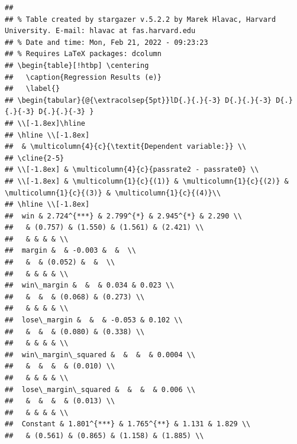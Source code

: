 \documentclass[
  12pt,
  landscape]{article}
\begin{document}
\begin{verbatim}
## 
## % Table created by stargazer v.5.2.2 by Marek Hlavac, Harvard University. E-mail: hlavac at fas.harvard.edu
## % Date and time: Mon, Feb 21, 2022 - 09:23:23
## % Requires LaTeX packages: dcolumn 
## \begin{table}[!htbp] \centering 
##   \caption{Regression Results (e)} 
##   \label{} 
## \begin{tabular}{@{\extracolsep{5pt}}lD{.}{.}{-3} D{.}{.}{-3} D{.}{.}{-3} D{.}{.}{-3} } 
## \\[-1.8ex]\hline 
## \hline \\[-1.8ex] 
##  & \multicolumn{4}{c}{\textit{Dependent variable:}} \\ 
## \cline{2-5} 
## \\[-1.8ex] & \multicolumn{4}{c}{passrate2 - passrate0} \\ 
## \\[-1.8ex] & \multicolumn{1}{c}{(1)} & \multicolumn{1}{c}{(2)} & \multicolumn{1}{c}{(3)} & \multicolumn{1}{c}{(4)}\\ 
## \hline \\[-1.8ex] 
##  win & 2.724^{***} & 2.799^{*} & 2.945^{*} & 2.290 \\ 
##   & (0.757) & (1.550) & (1.561) & (2.421) \\ 
##   & & & & \\ 
##  margin &  & -0.003 &  &  \\ 
##   &  & (0.052) &  &  \\ 
##   & & & & \\ 
##  win\_margin &  &  & 0.034 & 0.023 \\ 
##   &  &  & (0.068) & (0.273) \\ 
##   & & & & \\ 
##  lose\_margin &  &  & -0.053 & 0.102 \\ 
##   &  &  & (0.080) & (0.338) \\ 
##   & & & & \\ 
##  win\_margin\_squared &  &  &  & 0.0004 \\ 
##   &  &  &  & (0.010) \\ 
##   & & & & \\ 
##  lose\_margin\_squared &  &  &  & 0.006 \\ 
##   &  &  &  & (0.013) \\ 
##   & & & & \\ 
##  Constant & 1.801^{***} & 1.765^{**} & 1.131 & 1.829 \\ 
##   & (0.561) & (0.865) & (1.158) & (1.885) \\ 

\end{verbatim}
\end{document}
